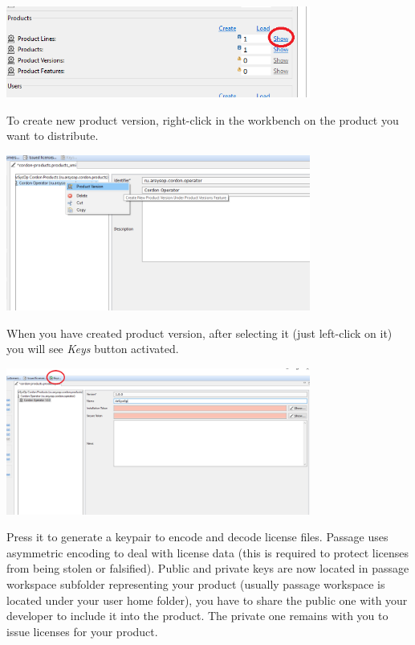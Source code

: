 \documentclass[12pt]{report}
\begin{document}
\begin{center}
    \includegraphics[width=0.75\textwidth]{product_line_show}
\end{center}

To create new product version, right-click in the workbench on the product you want to distribute.

\begin{center}
    \includegraphics[width=0.75\textwidth]{product_version_create}
\end{center}

When you have created product version, after selecting it (just left-click on it) you will see \textit{Keys} button activated. 

\begin{center}
    \includegraphics[width=0.75\textwidth]{product_version_keys}
\end{center}

Press it to generate a keypair to encode and decode license files.
Passage uses asymmetric encoding to deal with license data (this is required to protect licenses from being stolen or falsified). Public and private keys are now located in passage workspace subfolder representing your product
(usually passage workspace is located under your user home folder), you have to share the public one with your developer to include it into the product. The private one remains with you to issue
licenses for your product.
\end{document}
